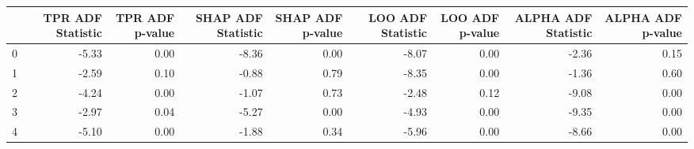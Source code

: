 \begin{tabular}{lrrrrrrrr}
\toprule
 & TPR ADF Statistic & TPR ADF p-value & SHAP ADF Statistic & SHAP ADF p-value & LOO ADF Statistic & LOO ADF p-value & ALPHA ADF Statistic & ALPHA ADF p-value \\
\midrule
0 & -5.33 & 0.00 & -8.36 & 0.00 & -8.07 & 0.00 & -2.36 & 0.15 \\
1 & -2.59 & 0.10 & -0.88 & 0.79 & -8.35 & 0.00 & -1.36 & 0.60 \\
2 & -4.24 & 0.00 & -1.07 & 0.73 & -2.48 & 0.12 & -9.08 & 0.00 \\
3 & -2.97 & 0.04 & -5.27 & 0.00 & -4.93 & 0.00 & -9.35 & 0.00 \\
4 & -5.10 & 0.00 & -1.88 & 0.34 & -5.96 & 0.00 & -8.66 & 0.00 \\
\bottomrule
\end{tabular}
